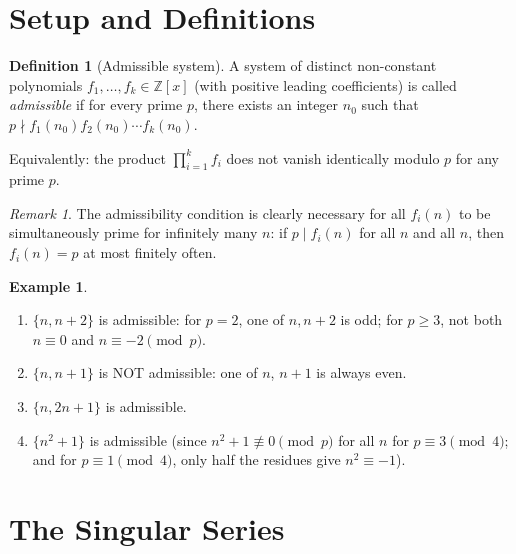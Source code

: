 \documentclass[12pt,a4paper]{amsart}
\theoremstyle{definition}
\newtheorem{definition}[theorem]{Definition}
\newtheorem{example}[theorem]{Example}
\theoremstyle{remark}
\newtheorem{remark}[theorem]{Remark}
\newcommand{\Z}{\mathbb{Z}}
\begin{document}
\section{Setup and Definitions}\label{sec:setup}

\begin{definition}[Admissible system]
  A system of distinct non-constant polynomials $f_1, \ldots, f_k \in \Z[x]$
  (with positive leading coefficients) is called \emph{admissible} if for every prime $p$,
  there exists an integer $n_0$ such that $p \nmid f_1(n_0) f_2(n_0) \cdots f_k(n_0)$.

  Equivalently: the product $\prod_{i=1}^k f_i$ does not vanish identically modulo $p$
  for any prime $p$.
\end{definition}

\begin{remark}
  The admissibility condition is clearly necessary for all $f_i(n)$ to be simultaneously
  prime for infinitely many $n$: if $p \mid f_i(n)$ for all $n$ and all $n$, then
  $f_i(n) = p$ at most finitely often.
\end{remark}

\begin{example}
  \begin{enumerate}[label=(\roman*)]
    \item $\{n, n+2\}$ is admissible: for $p=2$, one of $n, n+2$ is odd; for $p\geq 3$,
      not both $n \equiv 0$ and $n \equiv -2 \pmod{p}$.
    \item $\{n, n+1\}$ is NOT admissible: one of $n$, $n+1$ is always even.
    \item $\{n, 2n+1\}$ is admissible.
    \item $\{n^2+1\}$ is admissible (since $n^2+1 \not\equiv 0 \pmod{p}$ for all $n$
      for $p \equiv 3 \pmod{4}$; and for $p \equiv 1 \pmod{4}$, only half the residues
      give $n^2 \equiv -1$).
  \end{enumerate}
\end{example}

\section{The Singular Series}\label{sec:singular}
\end{document}
